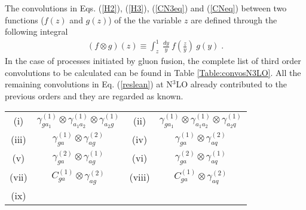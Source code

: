 \documentclass[12pt]{article}
\def\beeq{\begin{eqnarray}}
\def\eeeq{\end{eqnarray}}
\newcommand\f[2]{\frac{#1}{#2}}
\begin{document}
The convolutions in Eqs. (\ref{H2}), (\ref{H3}), (\ref{CN3eq}) and (\ref{CNeq}) between two functions ($f(z)$ and $g(z)$) of the the variable $z$ are defined through the following integral
\beeq
\left( f \otimes g \right)(z) \equiv \int^{1}_{z}~\f{dy}{y}~f\left(\f{z}{y}\right)~g(y)\;.
\eeeq
In the case of processes initiated by gluon fusion, the complete list of third order convolutions to be calculated can be found in Table \ref{Table:convosN3LO}. All the remaining convolutions in Eq. (\ref{reslean}) at N$^{3}$LO already  contributed to the previous orders and they are regarded as known.
\begin{table}
\begin{center}
\renewcommand{\arraystretch}{1.5}
\begin{tabular}{ |c|c||c|c| }
\hline
\multirow{1}{*}{(i)} 

& $\gamma^{(1)}_{ga_{1}}\otimes\gamma^{(1)}_{a_{1} a_{2}}\otimes\gamma^{(1)}_{a_{2}g}$

& \multirow{1}{*}{(ii)} 

& $\gamma^{(1)}_{ga_{1}}\otimes\gamma^{(1)}_{a_{1}a_{2}}\otimes\gamma^{(1)}_{a_{2}q}$  \\

\multirow{1}{*}{(iii)} 

& $\gamma^{(1)}_{ga}\otimes\gamma^{(2)}_{ag}$

& \multirow{1}{*}{(iv)} 

& $\gamma^{(1)}_{ga}\otimes\gamma^{(2)}_{aq}$  \\
\multirow{1}{*}{(v)} 

& $\gamma^{(2)}_{ga}\otimes\gamma^{(1)}_{ag}$

& \multirow{1}{*}{(vi)} 

& $\gamma^{(2)}_{ga}\otimes\gamma^{(1)}_{aq}$  \\
\multirow{1}{*}{(vii)} 

& $C^{(1)}_{ga}\otimes\gamma^{(2)}_{ag}$

& \multirow{1}{*}{(viii)} 

& $C^{(1)}_{ga}\otimes\gamma^{(2)}_{aq}$  \\
\multirow{1}{*}{(ix)} 


\end{tabular}
\end{center}
\end{table}
\end{document}
